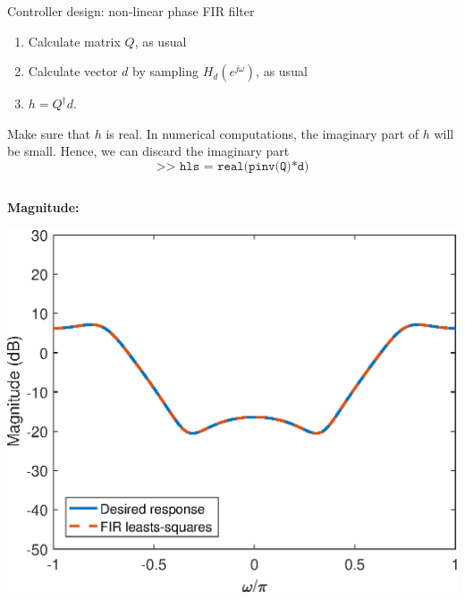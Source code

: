 \documentclass[10pt]{beamer}
\begin{document}
%
\begin{frame}{Controller design: non-linear phase FIR filter}
\begin{enumerate}
\item Calculate matrix $Q$, as usual
\item Calculate vector $d$ by sampling $H_d(e^{j\omega})$, as usual
\item $h = Q^{\dagger}d$.
\end{enumerate}

Make sure that $h$ is real. In numerical computations, the imaginary part of $h$ will be small. Hence, we can discard the imaginary part
\begin{equation*}
	\texttt{>> hls = real(pinv(Q)*d)}
\end{equation*}

\begin{columns}
	\begin{column}{0.45\textwidth}
		\textbf{Magnitude:}	
		\begin{center}
			\includegraphics[width=\textwidth]{../homework/figs/inverse_control_controller_nonlinear_phase_mag.eps}
		\end{center}
	\end{column}
	

\end{columns}
\end{frame}
\end{document}
